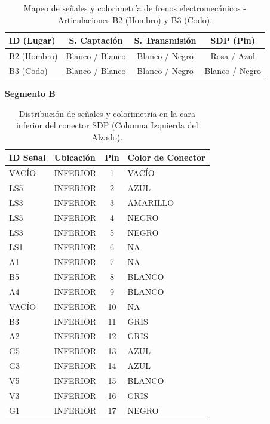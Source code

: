	\begin{table}[h]
		\centering
		\caption[Mapeo de señales: Frenos B2 y B3]{Mapeo de señales y colorimetría de frenos electromecánicos - Articulaciones B2 (Hombro) y B3 (Codo).}
		\label{tab:mapeo_frenos}
		\renewcommand{\arraystretch}{1.5}
		
		
		\begin{tabular}{lccc}
			\toprule
			\textbf{ID (Lugar)} & \textbf{S. Captación} & \textbf{S. Transmisión} & \textbf{SDP (Pin)} \\ 
			\midrule
			B2 (Hombro) & Blanco / Blanco & Blanco / Negro & Rosa / Azul \\
			B3 (Codo)   & Blanco / Blanco & Blanco / Negro & Blanco / Negro \\ 
			\bottomrule
		\end{tabular}
	\end{table}
	\textbf{Segmento B}
\begin{table}[h]
	\centering
	\caption[Mapeo SDP: Cara Inferior]{Distribución de señales y colorimetría en la cara inferior del conector SDP (Columna Izquierda del Alzado).}
	\label{tab:sdp_inferior}
	\renewcommand{\arraystretch}{1.5}
	\begin{tabular}{llcl}
		\toprule
		\textbf{ID Señal} & \textbf{Ubicación} & \textbf{Pin} & \textbf{Color de Conector} \\
		\midrule
		VACÍO & INFERIOR & 1  & VACÍO \\
		LS5   & INFERIOR & 2  & AZUL \\
		LS3   & INFERIOR & 3  & AMARILLO \\
		LS5   & INFERIOR & 4  & NEGRO \\
		LS3   & INFERIOR & 5  & NEGRO \\
		LS1   & INFERIOR & 6  & NA \\
		A1    & INFERIOR & 7  & NA \\
		B5    & INFERIOR & 8  & BLANCO \\
		A4    & INFERIOR & 9  & BLANCO \\
		VACÍO & INFERIOR & 10 & NA \\
		B3    & INFERIOR & 11 & GRIS \\
		A2    & INFERIOR & 12 & GRIS \\
		G5    & INFERIOR & 13 & AZUL \\
		G3    & INFERIOR & 14 & AZUL \\
		V5    & INFERIOR & 15 & BLANCO \\
		V3    & INFERIOR & 16 & GRIS \\
		G1    & INFERIOR & 17 & NEGRO \\
		\bottomrule
	\end{tabular}
\end{table}

